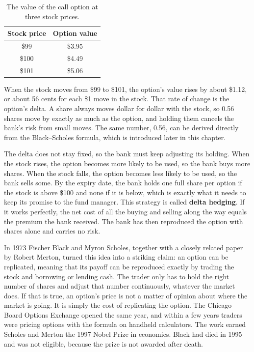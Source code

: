 \begin{table}[htbp]
\centering
\caption{The value of the call option at three stock prices.}
\label{tab:14-delta}
\begin{tabular}{@{}cc@{}}
\toprule
Stock price & Option value \\
\midrule
\$99  & \$3.95 \\
\$100 & \$4.49 \\
\$101 & \$5.06 \\
\bottomrule
\end{tabular}
\end{table}

When the stock moves from \$99 to \$101, the option's value rises by about \$1.12, or about 56 cents for each \$1 move in the stock. That rate of change is the option's delta. A share always moves dollar for dollar with the stock, so 0.56 shares move by exactly as much as the option, and holding them cancels the bank's risk from small moves. The same number, 0.56, can be derived directly from the Black--Scholes formula, which is introduced later in this chapter.

The delta does not stay fixed, so the bank must keep adjusting its holding. When the stock rises, the option becomes more likely to be used, so the bank buys more shares. When the stock falls, the option becomes less likely to be used, so the bank sells some. By the expiry date, the bank holds one full share per option if the stock is above \$100 and none if it is below, which is exactly what it needs to keep its promise to the fund manager. This strategy is called \textbf{delta hedging}. If it works perfectly, the net cost of all the buying and selling along the way equals the premium the bank received. The bank has then reproduced the option with shares alone and carries no risk.

In 1973 Fischer Black and Myron Scholes, together with a closely related paper by Robert Merton, turned this idea into a striking claim: an option can be replicated, meaning that its payoff can be reproduced exactly by trading the stock and borrowing or lending cash. The trader only has to hold the right number of shares and adjust that number continuously, whatever the market does. If that is true, an option's price is not a matter of opinion about where the market is going. It is simply the cost of replicating the option. The Chicago Board Options Exchange opened the same year, and within a few years traders were pricing options with the formula on handheld calculators. The work earned Scholes and Merton the 1997 Nobel Prize in economics. Black had died in 1995 and was not eligible, because the prize is not awarded after death.


